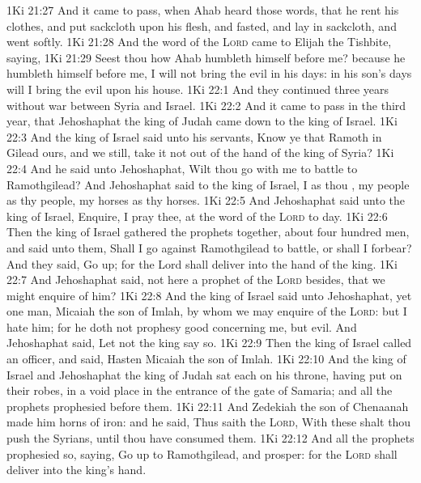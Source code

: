 \vs 1Ki 21:27 And it came to pass, when Ahab heard those words, that he rent his clothes, and put sackcloth upon his flesh, and fasted, and lay in sackcloth, and went softly.
\vs 1Ki 21:28 And the word of the \textsc{Lord} came to Elijah the Tishbite, saying,
\vs 1Ki 21:29 Seest thou how Ahab humbleth himself before me? because he humbleth himself before me, I will not bring the evil in his days:  in his son's days will I bring the evil upon his house.
\vs 1Ki 22:1 And they continued three years without war between Syria and Israel.
\vs 1Ki 22:2 And it came to pass in the third year, that Jehoshaphat the king of Judah came down to the king of Israel.
\vs 1Ki 22:3 And the king of Israel said unto his servants, Know ye that Ramoth in Gilead  ours, and we  still,  take it not out of the hand of the king of Syria?
\vs 1Ki 22:4 And he said unto Jehoshaphat, Wilt thou go with me to battle to Ramothgilead? And Jehoshaphat said to the king of Israel, I  as thou , my people as thy people, my horses as thy horses.
\vs 1Ki 22:5 And Jehoshaphat said unto the king of Israel, Enquire, I pray thee, at the word of the \textsc{Lord} to day.
\vs 1Ki 22:6 Then the king of Israel gathered the prophets together, about four hundred men, and said unto them, Shall I go against Ramothgilead to battle, or shall I forbear? And they said, Go up; for the Lord shall deliver  into the hand of the king.
\vs 1Ki 22:7 And Jehoshaphat said,  not here a prophet of the \textsc{Lord} besides, that we might enquire of him?
\vs 1Ki 22:8 And the king of Israel said unto Jehoshaphat,  yet one man, Micaiah the son of Imlah, by whom we may enquire of the \textsc{Lord}: but I hate him; for he doth not prophesy good concerning me, but evil. And Jehoshaphat said, Let not the king say so.
\vs 1Ki 22:9 Then the king of Israel called an officer, and said, Hasten  Micaiah the son of Imlah.
\vs 1Ki 22:10 And the king of Israel and Jehoshaphat the king of Judah sat each on his throne, having put on their robes, in a void place in the entrance of the gate of Samaria; and all the prophets prophesied before them.
\vs 1Ki 22:11 And Zedekiah the son of Chenaanah made him horns of iron: and he said, Thus saith the \textsc{Lord}, With these shalt thou push the Syrians, until thou have consumed them.
\vs 1Ki 22:12 And all the prophets prophesied so, saying, Go up to Ramothgilead, and prosper: for the \textsc{Lord} shall deliver  into the king's hand.
